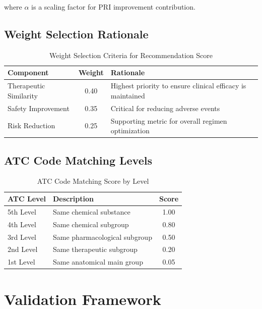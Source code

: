 \documentclass[11pt,a4paper]{article}
\begin{document}
where $\alpha$ is a scaling factor for PRI improvement contribution.

\subsection{Weight Selection Rationale}

\begin{table}[H]
\centering
\caption{Weight Selection Criteria for Recommendation Score}
\label{tab:weight_rationale}
\begin{tabular}{lcp{8cm}}
\toprule
\textbf{Component} & \textbf{Weight} & \textbf{Rationale} \\
\midrule
Therapeutic Similarity & 0.40 & Highest priority to ensure clinical efficacy is maintained \\
Safety Improvement & 0.35 & Critical for reducing adverse events \\
Risk Reduction & 0.25 & Supporting metric for overall regimen optimization \\
\bottomrule
\end{tabular}
\end{table}

\subsection{ATC Code Matching Levels}

\begin{table}[H]
\centering
\caption{ATC Code Matching Score by Level}
\label{tab:atc_levels}
\begin{tabular}{llc}
\toprule
\textbf{ATC Level} & \textbf{Description} & \textbf{Score} \\
\midrule
5th Level & Same chemical substance & 1.00 \\
4th Level & Same chemical subgroup & 0.80 \\
3rd Level & Same pharmacological subgroup & 0.50 \\
2nd Level & Same therapeutic subgroup & 0.20 \\
1st Level & Same anatomical main group & 0.05 \\
\bottomrule
\end{tabular}
\end{table}

\section{Validation Framework}
\end{document}
